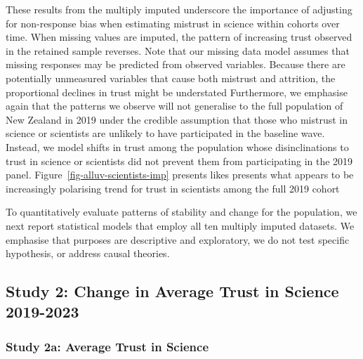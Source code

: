 \documentclass[
  single column]{article}
\begin{document}
These results from the multiply imputed underscore the importance of
adjusting for non-response bias when estimating mistrust in science
within cohorts over time. When missing values are imputed, the pattern
of increasing trust observed in the retained sample reverses. Note that
our missing data model assumes that missing responses may be predicted
from observed variables. Because there are potentially unmeasured
variables that cause both mistrust and attrition, the proportional
declines in trust might be understated Furthermore, we emphasise again
that the patterns we observe will not generalise to the full population
of New Zealand in 2019 under the credible assumption that those who
mistrust in science or scientists are unlikely to have participated in
the baseline wave. Instead, we model shifts in trust among the
population whose disinclinations to trust in science or scientists did
not prevent them from participating in the 2019 panel.
Figure~\ref{fig-alluv-scientists-imp} presents likes presents what
appears to be increasingly polarising trend for trust in scientists
among the full 2019 cohort

To quantitatively evaluate patterns of stability and change for the
population, we next report statistical models that employ all ten
multiply imputed datasets. We emphasise that purposes are descriptive
and exploratory, we do not test specific hypothesis, or address causal
theories.

\subsection{Study 2: Change in Average Trust in Science
2019-2023}\label{study-2-change-in-average-trust-in-science-2019-2023}

\subsubsection{Study 2a: Average Trust in
Science}\label{study-2a-average-trust-in-science}
\end{document}
